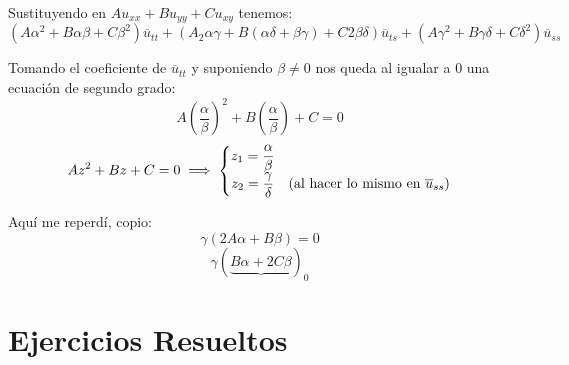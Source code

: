 \documentclass[openany]{book}
\begin{document}
\begin{method}
  Sustituyendo en $ Au_{xx} + Bu_{yy} + Cu_{xy} $ tenemos:
  $$ (A \alpha ^2+B \alpha \beta +C \beta^2)\overline{u}_{tt} + (A_2 \alpha \gamma +B(\alpha \delta + \beta \gamma)+C 2 \beta \delta)\overline{u}_{ts} + (A \gamma ^2  +B\gamma \delta + C \delta ^2 )\overline{u}_{ss}$$

  Tomando el coeficiente de $ \overline{u}_{tt} $ y suponiendo $ \beta \ne 0 $ nos queda al igualar a 0 una ecuación de segundo grado:
  $$ A \left(\dfrac{\alpha}{\beta}\right)^2 + B\left(\dfrac{\alpha}{\beta}\right) +C = 0 $$
  $$ A z^2 +Bz +C  =0 \implies \left\{
  \begin{matrix}
    z_1 = \dfrac{\alpha}{\beta}\\ 
    z_2 = \dfrac{\gamma}{\delta} & (\text{al hacer lo mismo en $ \overline{u}_{ss} $})
  \end{matrix}
  \right. $$

  Aquí me reperdí, copio:
  $$ \gamma(2A \alpha + B \beta) = 0 $$
  $$ \gamma (\underbrace{B \alpha +2C \beta})_{0} $$

\end{method}





\chapter{Ejercicios Resueltos}
\end{document}
